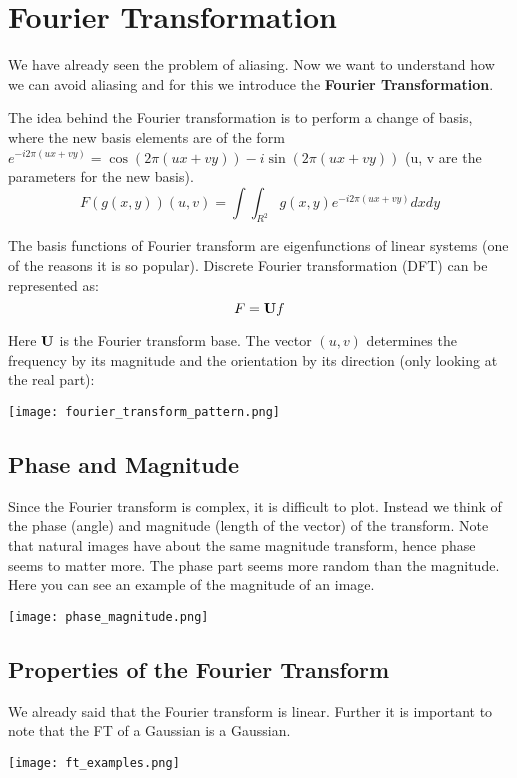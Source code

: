 \section{Fourier Transformation}

We have already seen the problem of aliasing. Now we want to understand how we can avoid aliasing and for this we introduce the \textbf{Fourier Transformation}. \medskip

The idea behind the Fourier transformation is to perform a change of basis, where the new basis elements are of the form $e^{-i2\pi (ux + vy)} = \cos (2 \pi (ux + vy)) - i \sin (2 \pi (ux + vy))$ (u, v are the parameters for the new basis).
$$F(g(x,y))(u,v) = \int \int_{R^2} g(x,y) e^{-i2\pi (ux + vy)} dxdy$$

The basis functions of Fourier transform are eigenfunctions of linear systems (one of the reasons it is so popular). Discrete Fourier transformation (DFT) can be represented as:
$$F = \textbf U f$$

Here $\textbf U$ is the Fourier transform base. The vector $(u,v)$ determines the frequency by its magnitude and the orientation by its direction (only looking at the real part):
\begin{center}
	\texttt{[image: fourier\_transform\_pattern.png]}
\end{center}


\subsection{Phase and Magnitude}

Since the Fourier transform is complex, it is difficult to plot. Instead we think of the phase (angle) and magnitude (length of the vector) of the transform. Note that natural images have about the same magnitude transform, hence phase seems to matter more. The phase part seems more random than the magnitude. Here you can see an example of the magnitude of an image.
\begin{center}
	\texttt{[image: phase\_magnitude.png]}
\end{center}


\subsection{Properties of the Fourier Transform}

We already said that the Fourier transform is linear. Further it is important to note that the FT of a Gaussian is a Gaussian. 
\begin{center}
	\texttt{[image: ft\_examples.png]}
\end{center}

